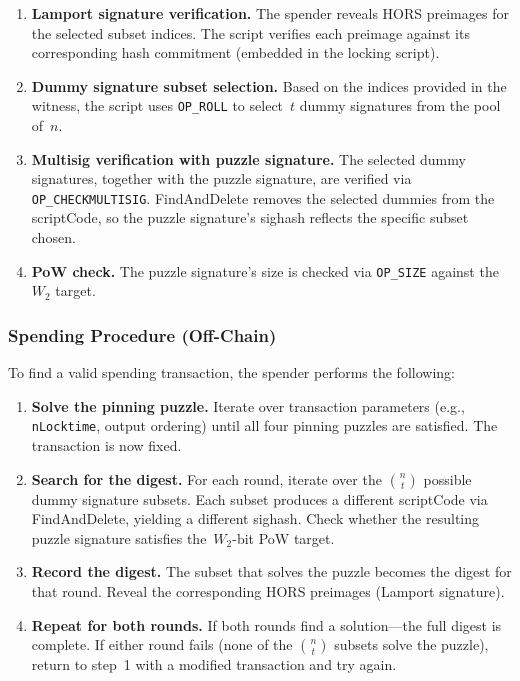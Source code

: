 \documentclass[11pt, a4paper]{article}
\begin{document}
\begin{enumerate}
    \item \textbf{Lamport signature verification.} The spender reveals HORS preimages for the selected subset indices. The script verifies each preimage against its corresponding hash commitment (embedded in the locking script).

    \item \textbf{Dummy signature subset selection.} Based on the indices provided in the witness, the script uses \texttt{OP\_ROLL} to select~$t$ dummy signatures from the pool of~$n$.

    \item \textbf{Multisig verification with puzzle signature.} The selected dummy signatures, together with the puzzle signature, are verified via \texttt{OP\_CHECKMULTISIG}. FindAndDelete removes the selected dummies from the scriptCode, so the puzzle signature's sighash reflects the specific subset chosen.

    \item \textbf{PoW check.} The puzzle signature's size is checked via \texttt{OP\_SIZE} against the~$W_2$ target.
\end{enumerate}

\subsubsection{Spending Procedure (Off-Chain)}

To find a valid spending transaction, the spender performs the following:

\begin{enumerate}
    \item \textbf{Solve the pinning puzzle.} Iterate over transaction parameters (e.g., \texttt{nLocktime}, output ordering) until all four pinning puzzles are satisfied. The transaction is now fixed.

    \item \textbf{Search for the digest.} For each round, iterate over the $\binom{n}{t}$ possible dummy signature subsets. Each subset produces a different scriptCode via FindAndDelete, yielding a different sighash. Check whether the resulting puzzle signature satisfies the~$W_2$-bit PoW target.

    \item \textbf{Record the digest.} The subset that solves the puzzle becomes the digest for that round. Reveal the corresponding HORS preimages (Lamport signature).

    \item \textbf{Repeat for both rounds.} If both rounds find a solution---the full digest is complete. If either round fails (none of the $\binom{n}{t}$ subsets solve the puzzle), return to step~1 with a modified transaction and try again.
\end{enumerate}
\end{document}
